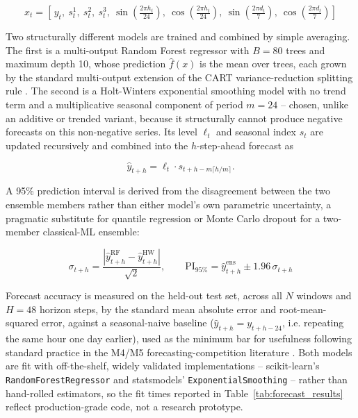 \documentclass[11pt,a4paper]{article}
\begin{document}
\begin{equation}
x_t = \left[\, y_t,\ s_t^1,\ s_t^2,\ s_t^3,\ \sin\!\left(\tfrac{2\pi h_t}{24}\right),\ \cos\!\left(\tfrac{2\pi h_t}{24}\right),\ \sin\!\left(\tfrac{2\pi d_t}{7}\right),\ \cos\!\left(\tfrac{2\pi d_t}{7}\right) \right]
\label{eq:forecast_features}
\end{equation}

Two structurally different models are trained and combined by simple averaging. The first is a multi-output Random Forest regressor \citep{breiman2001,breiman1984} with $B=80$ trees and maximum depth 10, whose prediction $\hat f(x)$ is the mean over trees, each grown by the standard multi-output extension of the CART variance-reduction splitting rule \citep{breiman1984}. The second is a Holt-Winters exponential smoothing model \citep{winters1960,holt2004} with no trend term and a multiplicative seasonal component of period $m=24$ -- chosen, unlike an additive or trended variant, because it structurally cannot produce negative forecasts on this non-negative series. Its level $\ell_t$ and seasonal index $s_t$ are updated recursively and combined into the $h$-step-ahead forecast as

\begin{equation}
\hat y_{t+h} = \ell_t \cdot s_{t+h-m\lceil h/m \rceil}.
\label{eq:hw}
\end{equation}

A 95\% prediction interval is derived from the disagreement between the two ensemble members rather than either model's own parametric uncertainty, a pragmatic substitute for quantile regression or Monte Carlo dropout for a two-member classical-ML ensemble:

\begin{equation}
\sigma_{t+h} = \frac{\left| \hat y_{t+h}^{\mathrm{RF}} - \hat y_{t+h}^{\mathrm{HW}} \right|}{\sqrt{2}}, \qquad
\mathrm{PI}_{95\%} = \hat y_{t+h}^{\mathrm{ens}} \pm 1.96\,\sigma_{t+h}
\label{eq:pi}
\end{equation}

Forecast accuracy is measured on the held-out test set, across all $N$ windows and $H=48$ horizon steps, by the standard mean absolute error and root-mean-squared error, against a seasonal-naive baseline ($\hat y_{t+h} = y_{t+h-24}$, i.e. repeating the same hour one day earlier), used as the minimum bar for usefulness following standard practice in the M4/M5 forecasting-competition literature \citep{makridakis2020}. Both models are fit with off-the-shelf, widely validated implementations -- scikit-learn's \texttt{RandomForestRegressor} \citep{pedregosa2011} and statsmodels' \texttt{ExponentialSmoothing} \citep{seabold2010} -- rather than hand-rolled estimators, so the fit times reported in Table~\ref{tab:forecast_results} reflect production-grade code, not a research prototype.
\end{document}
